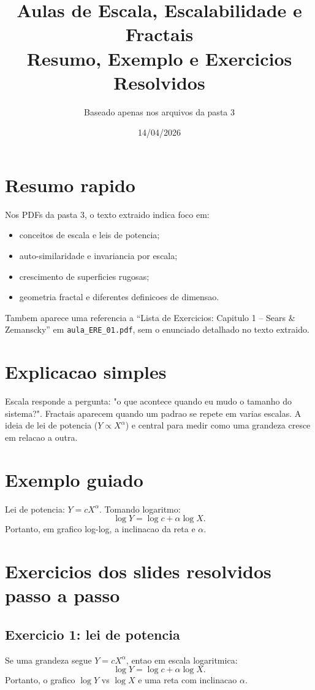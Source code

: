 \documentclass[12pt,a4paper]{article}
\title{Aulas de Escala, Escalabilidade e Fractais\\Resumo, Exemplo e Exercicios Resolvidos}
\author{Baseado apenas nos arquivos da pasta 3}
\date{14/04/2026}
\begin{document}
\maketitle

\section{Resumo rapido}
Nos PDFs da pasta 3, o texto extraido indica foco em:
\begin{itemize}
  \item conceitos de escala e leis de potencia;
  \item auto-similaridade e invariancia por escala;
  \item crescimento de superficies rugosas;
  \item geometria fractal e diferentes definicoes de dimensao.
\end{itemize}

Tambem aparece uma referencia a ``Lista de Exercicios: Capitulo 1 -- Sears \& Zemanscky'' em \texttt{aula\_ERE\_01.pdf}, sem o enunciado detalhado no texto extraido.

\section{Explicacao simples}
Escala responde a pergunta: "o que acontece quando eu mudo o tamanho do sistema?".
Fractais aparecem quando um padrao se repete em varias escalas.
A ideia de lei de potencia ($Y\propto X^{\alpha}$) e central para medir como uma grandeza cresce em relacao a outra.

\section{Exemplo guiado}
Lei de potencia: $Y=cX^{\alpha}$.
Tomando logaritmo:
\begin{equation}
\log Y = \log c + \alpha\log X.
\end{equation}
Portanto, em grafico log-log, a inclinacao da reta e $\alpha$.

\section{Exercicios dos slides resolvidos passo a passo}
\subsection*{Exercicio 1: lei de potencia}
Se uma grandeza segue $Y = cX^{\alpha}$, entao em escala logaritmica:
\begin{equation}
\log Y = \log c + \alpha \log X.
\end{equation}
Portanto, o grafico $\log Y$ vs $\log X$ e uma reta com inclinacao $\alpha$.
\end{document}
